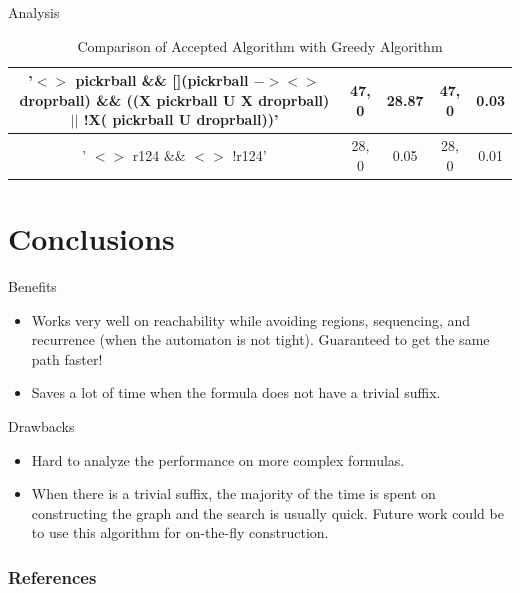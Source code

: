 \documentclass{beamer}
\begin{document}
\begin{frame}{Analysis}
\begin{table}[]
{\begin{tabular}{|c|c|c|c|c|}
   \makecell{ '$<>$ pickrball \&\& [](pickrball $-> <>$ droprball) \&\& \\ ((X pickrball U X droprball) $||$ !X( pickrball U droprball))' } &	47, 0	&	28.87	&	47, 0	&	0.03	\\		\hline
      ' $<>$ r124 \&\& $<>$ !r124' &	28, 0	&	0.05 	&	28, 0	&	0.01	\\		\hline
\end{tabular}}
\caption{Comparison of Accepted Algorithm with Greedy Algorithm}
\label{table}
\end{table}
\end{frame}


\section{Conclusions}
\begin{frame}{Benefits}
\begin{itemize}
\item Works very well on reachability while avoiding regions, sequencing, and recurrence (when the automaton is not tight). Guaranteed to get the same path faster!
\item Saves a lot of time when the formula does not have a trivial suffix.
\end{itemize}
\end{frame}

\begin{frame}{Drawbacks}
\begin{itemize}
\item Hard to analyze the performance on more complex formulas.
\item When there is a trivial suffix, the majority of the time is spent on constructing the graph and the search is usually quick. Future work could be to use this algorithm for on-the-fly construction. 
\end{itemize}


\end{frame}


\begin{frame}[allowframebreaks]
        \frametitle{References}
        
        
\end{frame}
\end{document}

